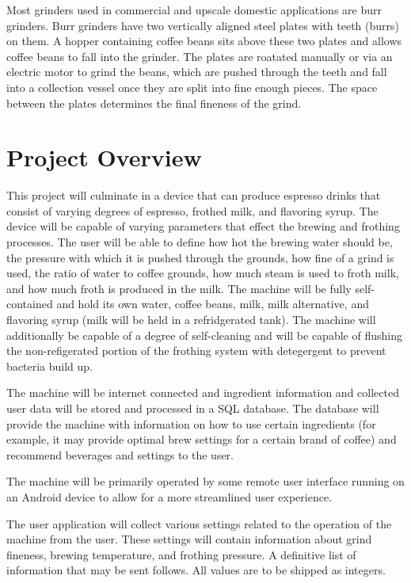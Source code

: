 \documentclass[conference]{IEEEtran}
\begin{document}
Most grinders used in commercial and upscale domestic applications are burr
grinders. Burr grinders have two vertically aligned steel plates with teeth
(burrs) on them. A hopper containing coffee beans sits above these two plates
and allows coffee beans to fall into the grinder.
The plates are roatated manually or via an electric motor to grind the beans,
which are pushed through the teeth and fall into a collection vessel once they
are split into fine enough pieces.
The space between the plates determines the final fineness of the grind.


\section{Project Overview}

This project will culminate in a device that can produce espresso drinks that
consist of varying degrees of espresso, frothed milk, and flavoring syrup. The
device will be capable of varying parameters that effect the brewing and
frothing processes. The user will be able to define how hot the brewing water
should be, the pressure with which it is pushed through the grounds, how fine of
a grind is used, the ratio of water to coffee grounds, how much steam is used to
froth milk, and how much froth is produced in the milk. The machine will be
fully self-contained and hold its own water, coffee beans, milk, milk
alternative, and flavoring syrup (milk will be held in a refridgerated tank).
The machine will additionally be capable of a degree of self-cleaning and will
be capable of flushing the non-refigerated portion of the frothing system with
detegergent to prevent bacteria build up.

The machine will be internet connected and ingredient information and collected
user data will be stored and processed in a SQL database. The database will
provide the machine with information on how to use certain ingredients (for
example, it may provide optimal brew settings for a certain brand of coffee)
and recommend beverages and settings to the user.

The machine will be primarily operated by some remote user interface running on an Android
device to allow for a more streamlined user experience.

The user application will collect various settings related to the operation of the
machine from the user. These settings will contain information about grind fineness, brewing
temperature, and frothing pressure. A definitive list of information that may be sent follows.
All values are to be shipped as integers.
\end{document}
